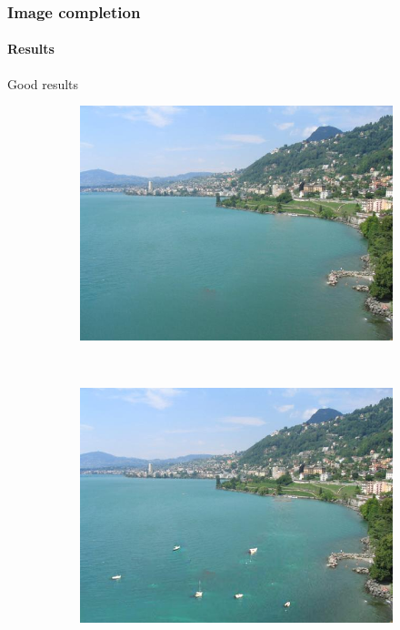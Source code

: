 \documentclass[11pt]{beamer}
\begin{document}
\begin{frame}
\frametitle{Image completion}
\framesubtitle{Results}
Good results
\begin{figure}
    \centering
    \begin{subfigure}[b]{0.45\textwidth}
        \includegraphics[width=\textwidth]{IMG_0681_25}

    \end{subfigure}
    ~ 
        \begin{subfigure}[b]{0.45\textwidth}
        \includegraphics[width=\textwidth]{IMG_0681_ts_01}

    \end{subfigure}



\end{figure}
\end{frame}
\end{document}
